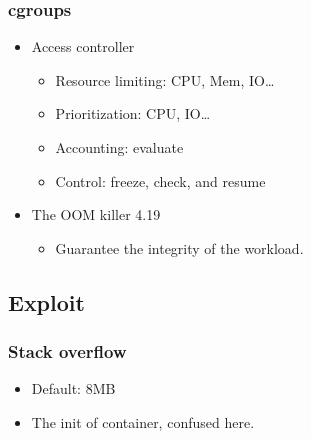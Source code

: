 \documentclass{beamer}
\begin{document}
\begin{frame}
    \frametitle{cgroups}
    \begin{itemize}
        \item Access controller
              \begin{itemize}
                  \item Resource limiting: CPU, Mem, IO\dots
                  \item Prioritization: CPU, IO\dots
                  \item Accounting: evaluate
                  \item Control: freeze, check, and resume
              \end{itemize}
        \item The OOM killer 4.19
              \begin{itemize}
                  \item Guarantee the integrity of the workload.
              \end{itemize}
    \end{itemize}
\end{frame}

\subsection{Exploit}
\begin{frame}
    \frametitle{Stack overflow}
    \begin{itemize}
        \item Default: 8MB
        \item The init of container, confused here.
    \end{itemize}
    \cite{thread}
\end{frame}

\end{document}
